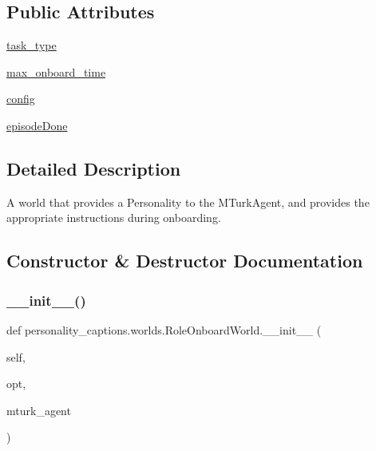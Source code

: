 \subsection*{Public Attributes}
\begin{DoxyCompactItemize}
\item 
\hyperlink{classpersonality__captions_1_1worlds_1_1RoleOnboardWorld_a6cf6206af24cf6a9402f23f620d4e365}{task\+\_\+type}
\item 
\hyperlink{classpersonality__captions_1_1worlds_1_1RoleOnboardWorld_aa6108733e26c2d1761e8155a65c2df12}{max\+\_\+onboard\+\_\+time}
\item 
\hyperlink{classpersonality__captions_1_1worlds_1_1RoleOnboardWorld_ade4545af6ba49e704c8df5d223c330f0}{config}
\item 
\hyperlink{classpersonality__captions_1_1worlds_1_1RoleOnboardWorld_a6f13341d6fc898dc7701a7e99133b885}{episode\+Done}
\end{DoxyCompactItemize}


\subsection{Detailed Description}
\begin{DoxyVerb}A world that provides a Personality to the MTurkAgent, and provides the appropriate
instructions during onboarding.
\end{DoxyVerb}
 

\subsection{Constructor \& Destructor Documentation}
\mbox{\label{classpersonality__captions_1_1worlds_1_1RoleOnboardWorld_a7c26e32198909d8f4527ac967605adb0}} 
\subsubsection{\texorpdfstring{\+\_\+\+\_\+init\+\_\+\+\_\+()}{\_\_init\_\_()}}
{\footnotesize\ttfamily def personality\+\_\+captions.\+worlds.\+Role\+Onboard\+World.\+\_\+\+\_\+init\+\_\+\+\_\+ (\begin{DoxyParamCaption}\item[{}]{self,  }\item[{}]{opt,  }\item[{}]{mturk\+\_\+agent }\end{DoxyParamCaption})}



